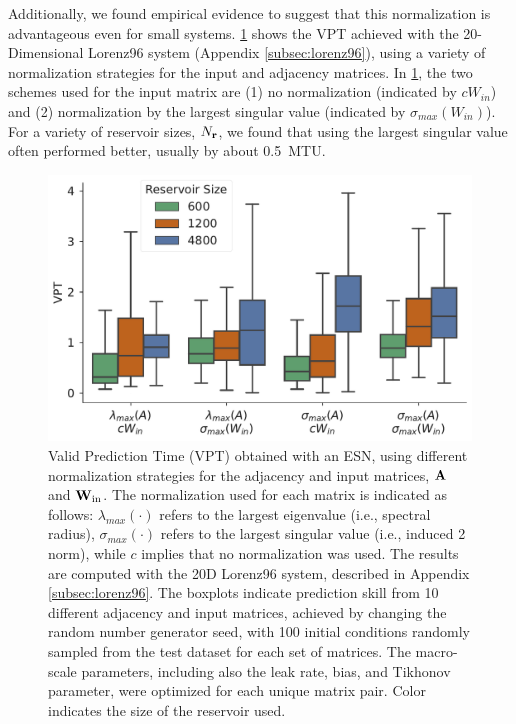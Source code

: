 Additionally, we found empirical evidence to suggest that this normalization is
advantageous even for small systems.
\cref{fig:simple-normalization} shows the VPT achieved with
the 20-Dimensional Lorenz96 system (Appendix \cref{subsec:lorenz96}), using a variety of
normalization strategies for the input and adjacency matrices.
In \cref{fig:simple-normalization}, the two schemes used for the input matrix
are (1) no normalization (indicated by $c W_{in}$) and
(2) normalization by the largest singular value (indicated by
$\sigma_{max}(W_{in})$).
For a variety of reservoir sizes, $N_{\mathbf{r}}$, we found that using the largest
singular value often performed better, usually by about 0.5~MTU.

\begin{figure}
    \centering
    \includegraphics[width=.8\textwidth]{../figures/matrix_normalization.pdf}
    \caption{Valid Prediction Time (VPT) obtained with an ESN, using
        different normalization strategies for the adjacency and input matrices,
        $\mathbf{A}$ and $\mathbf{W}_\text{in}$. The normalization used for each matrix
        is indicated as follows:
        $\lambda_{max}(\cdot)$ refers to the largest eigenvalue (i.e.,
        spectral radius),
        $\sigma_{max}(\cdot)$ refers to the largest singular value (i.e.,
        induced 2 norm),
        while $c$ implies that no normalization was used.
        The results are computed with the 20D Lorenz96 system, described in
        Appendix \cref{subsec:lorenz96}.
        The boxplots indicate prediction skill from 10 different adjacency and
        input matrices, achieved by changing the random number generator seed,
        with 100 initial conditions randomly sampled from the test dataset for
        each set of matrices.
        The macro-scale parameters, including also the leak rate, bias, and
        Tikhonov parameter, were optimized for each unique matrix pair.
        Color indicates the size of the reservoir used.
    }
    \label{fig:simple-normalization}
\end{figure}

